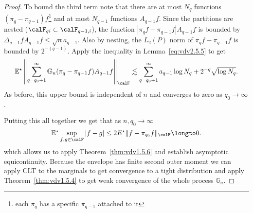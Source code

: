 \begin{proof}
	To bound the third term note that there are at most \(N_q\) functions \((\pi_q-\pi_{q-1})f\)\footnote{each \(\pi_q\) has a specific \(\pi_{q-1}\) attached to it} and at most \(N_{q-1}\) functions \(A_{q-1}f\). Since the partitions are nested (\(\calF_{qi}\subset\calF_{q-1,i}\)), the function \(|\pi_qf-\pi_{q-1}f|A_{q-1}f\) is bounded by \(\Delta_{q-1}fA_{q-1}f\leq \sqrt{n}a_{q-1}\). Also by nesting, the \(L_2(P)\) norm of \(\pi_qf-\pi_{q-1}f\) is bounded by \(2^{-(q-1)}\). Apply the inequality in Lemma~\ref{eq:vdv2.5.5} to get
	\[
		\E^\star\left\|\sum_{q=q_0+1}^\infty \mathbb{G}_n(\pi_q-\pi_{q-1}f)A_{q-1}f\right\|_\calF \lesssim \sum_{q=q_0+1}^\infty a_{q-1}\log N_q + 2^{-q}\sqrt{\log N_q} 
	.\] 
	As before, this upper bound is independent of \(n\) and converges to zero as \(q_0\to\infty\).

	Putting this all together we get that as \(n,q_0\to\infty\) 
	\[
		\E^\star\sup_{f,g\in\calF}|f-g| \leq 2E^\star \|f-\pi_{q_0}f\|_\calF\longto 0
	.\]
	which allows us to apply Theorem~\ref{thm:vdv1.5.6} and establish asymptotic equicontinuity. Because the envelope has finite second outer moment we can apply CLT to the marginals to get convergence to a tight distribution and apply Theorem~\ref{thm:vdv1.5.4} to get weak convergence of the whole process \(\mathbb{G}_n\).
\end{proof}

